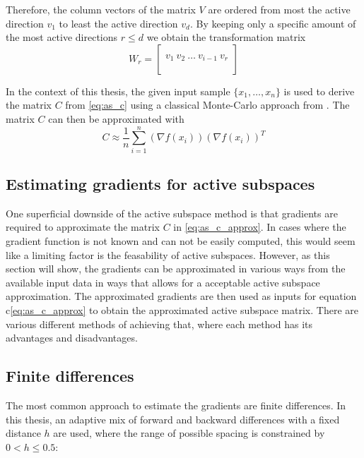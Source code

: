 \documentclass[
  a4paper,  %
  twoside,  %
  bibliography=totoc,
  headsepline,
  cleardoublepage=empty,
  parskip=half,
  draft=false
]{scrbook}
\begin{document}
Therefore, the column vectors of the matrix $V$ are ordered from most the active direction $v_1$ to least the active direction $v_d$.
By keeping only a specific amount of the most active directions $r \leq d$ we obtain the transformation matrix
\begin{equation}
W_r=\begin{bmatrix}
  \\
    v_1 ~ v_2 ~ \dots ~ v_{i-1} ~ v_r\\
    \\
  \end{bmatrix}
\label{basis}
\end{equation}

In the context of this thesis, the given input sample $\{x_1, \dots, x_n\}$ is used to derive the matrix $C$ from \cref{eq:as_c} using a classical Monte-Carlo approach from \cite{}.
The matrix $C$ can then be approximated with
\begin{equation}
C \approx \frac{1}{n} \sum_{i=1}^n  (\nabla f(x_i)) (\nabla f(x_i))^T
\label{eq:as_c_approx}
\end{equation}

\subsection{Estimating gradients for active subspaces}

One superficial downside of the active subspace method is that gradients are required to approximate the matrix $C$ in \cref{eq:as_c_approx}.
In cases where the gradient function is not known and can not be easily computed, this would seem like a limiting factor is the feasability of active subspaces.
However, as this section will show, the gradients can be approximated in various ways from the available input data in ways that allows for a acceptable active subspace approximation.
The approximated gradients are then used as inputs for equation c\cref{eq:as_c_approx} to obtain the approximated active subspace matrix.
There are various different methods of achieving that, where each method has its advantages and disadvantages.

\subsection{Finite differences}

The most common approach to estimate the gradients are finite differences.
In this thesis, an adaptive mix of forward and backward differences with a fixed distance $h$ are used, where the range of possible spacing is constrained by $0 < h \leq 0.5$:
\end{document}
